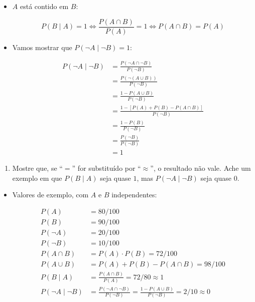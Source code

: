 \documentclass[
  11pt]{report}
\providecommand{\tightlist}{%
  \setlength{\itemsep}{0pt}\setlength{\parskip}{0pt}}
\begin{document}
\begin{itemize}
\item
  $A$ está contido em $B$:

  \[
  P(B \mid A) = 1 
  \iff \frac{P(A \cap B)}{P(A)} = 1
  \iff P(A \cap B) = P(A)
  \]
\item
  Vamos mostrar que $P(\neg A \mid \neg B) = 1$:

  \[
  \begin{aligned}
  P(\neg A \mid \neg B) 
  &= \frac{P(\neg A \cap \neg B)}{P(\neg B)} \\
  &= \frac{P(\neg (A \cup B))}{P(\neg B)} \\
  &= \frac{1 - P(A \cup B)}{P(\neg B)} \\
  &= \frac{1 - \left[ P(A) + P(B) - P(A \cap B) \right]}{P(\neg B)} \\
  &= \frac{1 - P(B)}{P(\neg B)} \\
  &= \frac{P(\neg B)}{P(\neg B)} \\
  &= 1
  \end{aligned}
  \]
\end{itemize}

\begin{rmdbox}

\begin{enumerate}
\def\labelenumi{\alph{enumi}.}
\setcounter{enumi}{1}
\tightlist
\item
  Mostre que, se ``$=$'' for substituído por ``$\approx$'', o resultado não vale. Ache um exemplo em que $P(B \mid A)$ seja quase $1$, mas $P(\neg A \mid \neg B)$ seja quase $0$.
\end{enumerate}

\end{rmdbox}

\begin{itemize}
\item
  Valores de exemplo, com $A$ e $B$ independentes:

  \[
  \begin{aligned}
  P(A) &= 80/100 \\
  P(B) &= 90/100 \\
  P(\neg A) &= 20/100 \\
  P(\neg B) &= 10/100 \\
  P(A \cap B) &= P(A) \cdot P(B) = 72/100 \\
  P(A \cup B) &= P(A) + P(B) - P(A \cap B) = 98/100\\
  P(B \mid A) &= \frac{P(A \cap B)}{P(A)} = 72/80 \approx 1 \\
  P(\neg A \mid \neg B) &= \frac{P(\neg A \cap \neg B)}{P(\neg B)} = 
    \frac{1 - P(A \cup B)}{P(\neg B)} = 2/10 \approx 0
  \end{aligned}
  \]
\end{itemize}
\end{document}
